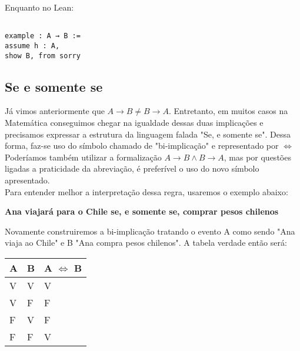 Enquanto no Lean:

\vspace{5mm}
\begin{lstlisting} 

example : A → B :=
assume h : A,
show B, from sorry

\end{lstlisting}
\vspace{5mm}

\subsection{Se e somente se}

Já vimos anteriormente que $A \rightarrow B \neq B \rightarrow A$. Entretanto, em muitos casos na Matemática conseguimos chegar na igualdade dessas duas implicações e precisamos expressar a estrutura da linguagem falada "Se, e somente se". Dessa forma, faz-se uso do símbolo chamado de "bi-implicação" e representado por $\iff$ \\
Poderíamos também utilizar a formalização $A \rightarrow B \land B \rightarrow A$, mas por questões ligadas a praticidade da abreviação, é preferível o uso do novo símbolo apresentado.\\
Para entender melhor a interpretação dessa regra, usaremos o exemplo abaixo:

\begin{center}
    \textbf{Ana viajará para o Chile se, e somente se, comprar pesos chilenos}
\end{center}

Novamente construiremos a bi-implicação tratando o evento A como sendo "Ana viaja ao Chile" e B "Ana compra pesos chilenos". A tabela verdade então será:

\begin{table}[htb]
\centering
\begin{tabular}{|l|l|l|}
\hline

\textbf{A} & \textbf{B} & \textbf{A $\iff$ B} \\ \hline
V          & V          & V                  \\ \hline
V          & F          & F                  \\ \hline
F          & V          & F                  \\ \hline
F          & F          & V                  \\ \hline

\end{tabular}
\end{table}

